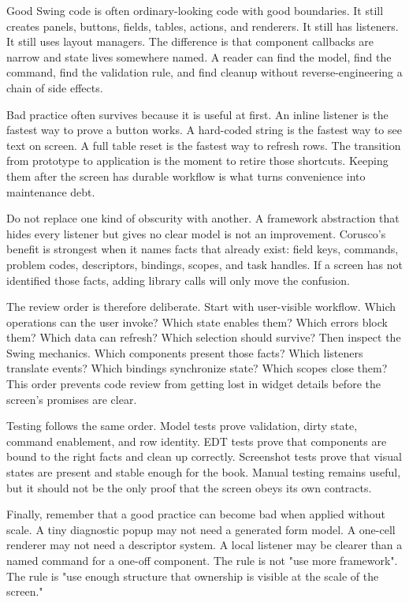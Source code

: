Good Swing code is often ordinary-looking code with good boundaries. It still
creates panels, buttons, fields, tables, actions, and renderers. It still has
listeners. It still uses layout managers. The difference is that component
callbacks are narrow and state lives somewhere named. A reader can find the
model, find the command, find the validation rule, and find cleanup without
reverse-engineering a chain of side effects.

Bad practice often survives because it is useful at first. An inline listener is
the fastest way to prove a button works. A hard-coded string is the fastest way
to see text on screen. A full table reset is the fastest way to refresh rows.
The transition from prototype to application is the moment to retire those
shortcuts. Keeping them after the screen has durable workflow is what turns
convenience into maintenance debt.

Do not replace one kind of obscurity with another. A framework abstraction that
hides every listener but gives no clear model is not an improvement. Corusco's
benefit is strongest when it names facts that already exist: field keys,
commands, problem codes, descriptors, bindings, scopes, and task handles. If a
screen has not identified those facts, adding library calls will only move the
confusion.

The review order is therefore deliberate. Start with user-visible workflow.
Which operations can the user invoke? Which state enables them? Which errors
block them? Which data can refresh? Which selection should survive? Then inspect
the Swing mechanics. Which components present those facts? Which listeners
translate events? Which bindings synchronize state? Which scopes close them?
This order prevents code review from getting lost in widget details before the
screen's promises are clear.

Testing follows the same order. Model tests prove validation, dirty state,
command enablement, and row identity. EDT tests prove that components are bound
to the right facts and clean up correctly. Screenshot tests prove that visual
states are present and stable enough for the book. Manual testing remains
useful, but it should not be the only proof that the screen obeys its own
contracts.

Finally, remember that a good practice can become bad when applied without
scale. A tiny diagnostic popup may not need a generated form model. A one-cell
renderer may not need a descriptor system. A local listener may be clearer than
a named command for a one-off component. The rule is not "use more framework".
The rule is "use enough structure that ownership is visible at the scale of the
screen."

